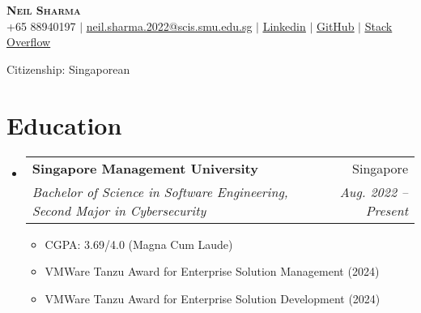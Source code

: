\documentclass[letterpaper,11pt]{article}
\makeatletter
\newcommand{\resumeItem}[1]{
  \item\small{
    {#1 \vspace{-2pt}}
  }
}
\newcommand{\resumeSubheading}[4]{
  \vspace{-2pt}\item
    \begin{tabular*}{0.97\textwidth}[t]{l@{\extracolsep{\fill}}r}
      \textbf{#1} & #2 \\
      \textit{\small#3} & \textit{\small #4} \\
    \end{tabular*}\vspace{-7pt}
}
\newcommand{\resumeSubHeadingListStart}{\begin{itemize}[leftmargin=0.15in, label={}]}
\newcommand{\resumeSubHeadingListEnd}{\end{itemize}}
\newcommand{\resumeItemListStart}{\begin{itemize}}
\newcommand{\resumeItemListEnd}{\end{itemize}\vspace{-5pt}}
\makeatother
\begin{document}
\begin{center}
    \textbf{\Huge \scshape Neil Sharma} \\
    \small +65 88940197 $|$ \href{mailto:neil.sharma.2022@scis.smu.edu.sg}{\underline{neil.sharma.2022@scis.smu.edu.sg}} $|$ 
    \href{https://linkedin.com/in/neil-sharma-sg}{\underline{Linkedin}} $|$
   \href{https://github.com/neilscallywag}{\underline{GitHub}} $|$
\href{https://stackoverflow.com/users/16589387/neil}{\underline{Stack Overflow}}
 \vspace{1pt}

\small{Citizenship: Singaporean}
\end{center}


\section{Education}
  \resumeSubHeadingListStart
    \resumeSubheading
      {Singapore Management University}{Singapore}
      {Bachelor of Science in Software Engineering, Second Major in Cybersecurity}{Aug. 2022 -- Present}
 \resumeItemListStart
        \resumeItem{CGPA: 3.69/4.0 (Magna Cum Laude)}
        \resumeItem{VMWare Tanzu Award for Enterprise Solution Management (2024)}
        \resumeItem{VMWare Tanzu Award for Enterprise Solution Development (2024)}
      \resumeItemListEnd
  \resumeSubHeadingListEnd


\end{document}
